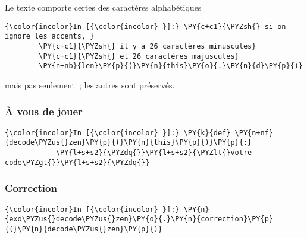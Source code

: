     Le texte comporte certes des caractères alphabétiques

    \begin{Verbatim}[commandchars=\\\{\}]
{\color{incolor}In [{\color{incolor} }]:} \PY{c+c1}{\PYZsh{} si on ignore les accents, }
        \PY{c+c1}{\PYZsh{} il y a 26 caractères minuscules}
        \PY{c+c1}{\PYZsh{} et 26 caractères majuscules}
        \PY{n+nb}{len}\PY{p}{(}\PY{n}{this}\PY{o}{.}\PY{n}{d}\PY{p}{)}
\end{Verbatim}


    mais pas seulement~; les autres sont préservés.

    \hypertarget{uxe0-vous-de-jouer}{%
\subsubsection{À vous de jouer}\label{uxe0-vous-de-jouer}}

    \begin{Verbatim}[commandchars=\\\{\}]
{\color{incolor}In [{\color{incolor} }]:} \PY{k}{def} \PY{n+nf}{decode\PYZus{}zen}\PY{p}{(}\PY{n}{this}\PY{p}{)}\PY{p}{:}
            \PY{l+s+s2}{\PYZdq{}}\PY{l+s+s2}{\PYZlt{}votre code\PYZgt{}}\PY{l+s+s2}{\PYZdq{}}
\end{Verbatim}


    \hypertarget{correction}{%
\subsubsection{Correction}\label{correction}}

    \begin{Verbatim}[commandchars=\\\{\}]
{\color{incolor}In [{\color{incolor} }]:} \PY{n}{exo\PYZus{}decode\PYZus{}zen}\PY{o}{.}\PY{n}{correction}\PY{p}{(}\PY{n}{decode\PYZus{}zen}\PY{p}{)}
\end{Verbatim}
